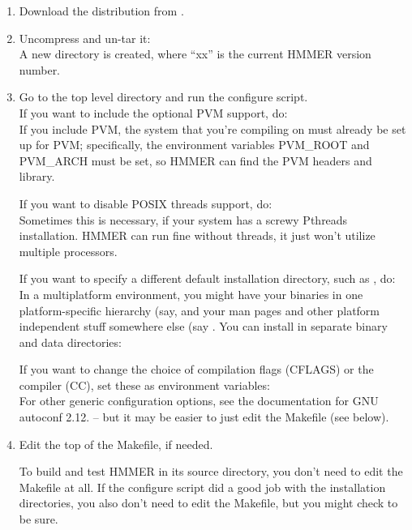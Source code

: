 \begin{enumerate}
\item Download the distribution from .

\item Uncompress and un-tar it:\\
A new directory  is created, where ``xx'' is
the current HMMER version number.

\item Go to the top level directory and run the
      configure script.\\
If you want to include the optional PVM support, do:\\
If you include PVM, the system that you're compiling on must already
be set up for PVM; specifically, the environment variables PVM\_ROOT
and PVM\_ARCH must be set, so HMMER can find the PVM headers and
library.

If you want to disable POSIX threads support, do:\\
Sometimes this is necessary, if your system has a screwy 
Pthreads installation. HMMER can run fine without threads,
it just won't utilize multiple processors.

If you want to specify a different default installation directory,
such as , do:\\
In a multiplatform environment, you might have your binaries
in one platform-specific hierarchy (say, 
and your man pages and other platform independent stuff somewhere
else (say . You can install in 
separate binary and data directories:\\

If you want to change the choice of compilation flags (CFLAGS) or the
compiler (CC), set these as environment variables:\\
For other generic configuration options, see the documentation for GNU
autoconf 2.12. -- but it may be easier to just edit the
Makefile (see below).

\item Edit the top of the Makefile, if needed. 

To build and test HMMER in its source directory, you don't need to
edit the Makefile at all. If the configure script did a good job with
the installation directories, you also don't need to edit the
Makefile, but you might check to be sure.


\end{enumerate}
